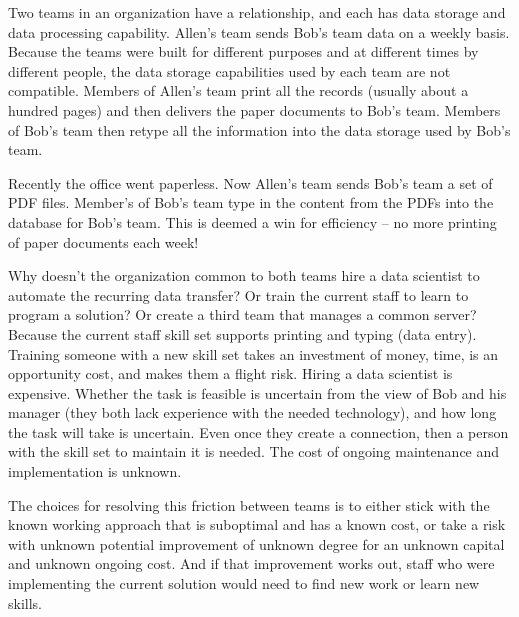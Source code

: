 \begin{mdframed}[frametitle={Data Transfer from one Team to Another},frametitlerule=true,frametitlealignment=\centering]
Two teams in an organization have a relationship, and each has data storage and data processing capability. Allen's team sends Bob's team data on a weekly basis. Because the teams were built for different purposes and at different times by different people, the data storage capabilities used by each team are not compatible. Members of Allen's team print all the records (usually about a hundred pages) and then delivers the paper documents to Bob's team. Members of Bob's team then retype all the information into the data storage used by Bob's team.

Recently the office went paperless. Now Allen's team sends Bob's team a set of PDF files. Member's of Bob's team type in the content from the PDFs into the database for Bob's team. This is deemed a win for efficiency -- no more printing of paper documents each week!

Why doesn't the organization common to both teams hire a data scientist to automate the recurring data transfer? Or train the current staff to learn to program a solution? Or create a third team that manages a common server?
Because the current staff skill set supports printing and typing (data entry). Training someone with a new skill set takes an investment of money, time, is an opportunity cost, and makes them a flight risk.
Hiring a data scientist is expensive. Whether the task is feasible is uncertain from the view of Bob and his manager (they both lack experience with the needed technology), and how long the task will take is uncertain. Even once they create a connection, then a person with the skill set to maintain it is needed. The cost of ongoing maintenance and implementation is unknown.

\end{mdframed}
The choices for resolving this friction between teams is to either stick with the known working approach that is suboptimal and has a known cost, or take a risk with unknown potential improvement of unknown degree for an unknown capital and unknown ongoing cost.
And if that improvement works out, staff who were implementing the current solution would need to find new work or learn new skills.
